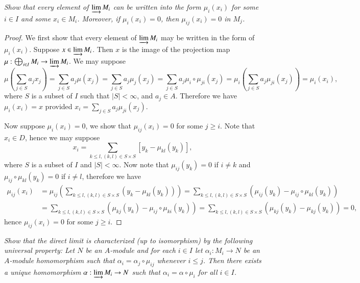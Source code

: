 \begin{problem}\em
Show that every element of $\varinjlim M_i$ can be written into the form $\mu_i(x_i)$ for some $i\in I$ and some $x_i\in M_i$. Moreover, if $\mu_i(x_i)=0$, then $\mu_{ij}(x_i)=0$ in $M_j$.
\end{problem}
\begin{proof}
We first show that every element of $\varinjlim M_i$ may be written in the form of $\mu_i(x_i)$. Suppose $x\in\varinjlim M_i$. Then $x$ is the image of the projection map $\mu:\bigoplus_{i\in I}M_i\to\varinjlim M_i$. We may suppose 
$$
\mu \left( \sum_{j\in S}{a_jx_j} \right) =\sum_{j\in S}{a_j\mu \left( x_j \right)}=\sum_{j\in S}{a_j\mu _j\left( x_j \right)}=\sum_{j\in S}{a_j\mu _i\circ \mu _{ji}\left( x_j \right)}=\mu _i\left( \sum_{j\in S}{a_j\mu _{ji}\left( x_j \right)} \right) =\mu _i\left( x_i \right) ,
$$
where $S$ is a subset of $I$ such that $|S|<\infty$, and $a_j\in A$. Therefore we have $\mu_i(x_i)=x$ provided $x_i=\sum_{j\in S}{a_j\mu _{ji}\left( x_j \right)}$.\par
Now suppose $\mu_i(x_i)=0$, we show that $\mu_{ij}(x_i)=0$ for some $j\ge i$. Note that $x_i\in D$, hence we may suppose 
$$
x_i=\sum_{k\le l,\left( k,l \right) \in S\times S}{\left[ y_k-\mu _{kl}\left( y_k \right) \right]},
$$
where $S$ is a subset of $I$ and $|S|<\infty$. Now note that $\mu_{ij}(y_k)=0$ if $i\ne k$ and $\mu_{ij}\circ\mu_{kl}(y_k)=0$ if $i\ne l$, therefore we have 
$$
\begin{aligned}
\mu _{ij}\left( x_i \right) &=\mu _{ij}\left( \sum_{k\le l,\left( k,l \right) \in S\times S}{\left( y_k-\mu _{kl}\left( y_k \right) \right)} \right) =\sum_{k\le l,\left( k,l \right) \in S\times S}{\left( \mu _{ij}\left( y_k \right) -\mu _{ij}\circ \mu _{kl}\left( y_k \right) \right)}
\\
&=\sum_{k\le l,\left( k,l \right) \in S\times S}{\left( \mu _{kj}\left( y_k \right) -\mu _{ij}\circ \mu _{ki}\left( y_k \right) \right)}=\sum_{k\le l,\left( k,l \right) \in S\times S}{\left( \mu _{kj}\left( y_k \right) -\mu _{kj}\left( y_k \right) \right)}=0,
\end{aligned}
$$
hence $\mu_{ij}(x_i)=0$ for some $j\ge i$.
\end{proof}
\begin{problem}\em
Show that the direct limit is characterized (up to isomorphism) by the following universal property: Let $N$ be an $A$-module and for each $i\in I$ let $\alpha_i:M_i\to N$ be an $A$-module homomorphism such that $\alpha_i=\alpha_j\circ\mu_{ij}$ whenever $i\le j$. Then there exists a unique homomorphism $\alpha:\varinjlim M_i\to N$ such that $\alpha_i=\alpha\circ\mu_i$ for all $i\in I$.
\end{problem}
